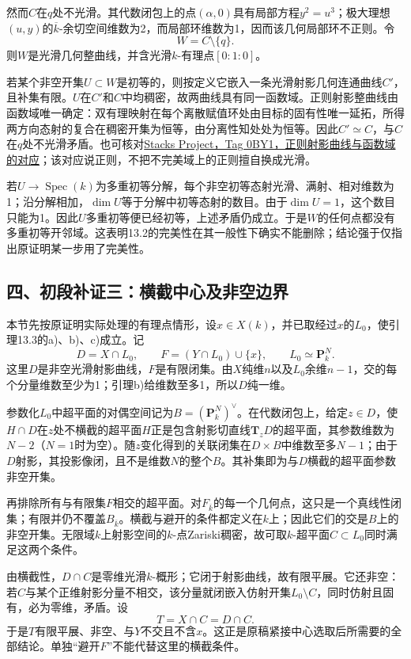 \documentclass[UTF8,a4paper]{ctexbook}
\DeclareMathOperator{\Spec}{Spec}
\begin{document}
然而$C$在$q$处不光滑。其代数闭包上的点$(\alpha,0)$具有局部方程$y^2=u^3$；极大理想$(u,y)$的$\overline k$-余切空间维数为2，而局部环维数为1，因而该几何局部环不正则。令
\[
W=C\setminus\{q\}.
\]
则$W$是光滑几何整曲线，并含光滑$k$-有理点$[0:1:0]$。

若某个非空开集$U\subset W$是初等的，则按定义它嵌入一条光滑射影几何连通曲线$C'$，且补集有限。$U$在$C'$和$C$中均稠密，故两曲线具有同一函数域。正则射影整曲线由函数域唯一确定：双有理映射在每个离散赋值环处由目标的固有性唯一延拓，所得两方向态射的复合在稠密开集为恒等，由分离性知处处为恒等。因此$C'\simeq C$，与$C$在$q$处不光滑矛盾。也可核对\href{https://stacks.math.columbia.edu/tag/0BY1}{Stacks Project，Tag 0BY1，正则射影曲线与函数域的对应}；该对应说正则，不把不完美域上的正则擅自换成光滑。

若$U\to\Spec(k)$为多重初等分解，每个非空初等态射光滑、满射、相对维数为1；沿分解相加，$\dim U$等于分解中初等态射的数目。由于$\dim U=1$，这个数目只能为1。因此$U$多重初等便已经初等，上述矛盾仍成立。于是$W$的任何点都没有多重初等开邻域。这表明13.2的完美性在其一般性下确实不能删除；结论强于仅指出原证明某一步用了完美性。

\subsection*{四、初段补证三：横截中心及非空边界}

本节先按原证明实际处理的有理点情形，设$x\in X(k)$，并已取经过$x$的$L_0$，使引理13.3的a)、b)、c)成立。记
\[
D=X\cap L_0,\qquad F=(Y\cap L_0)\cup\{x\},\qquad L_0\simeq\mathbf P^N_k.
\]
这里$D$是非空光滑射影曲线，$F$是有限闭集。由$X$纯维$n$以及$L_0$余维$n-1$，交的每个分量维数至少为1；引理b)给维数至多1，所以$D$纯一维。

参数化$L_0$中超平面的对偶空间记为$B=(\mathbf P^N_k)^\vee$。在代数闭包上，给定$z\in D$，使$H\cap D$在$z$处不横截的超平面$H$正是包含射影切直线$\mathbf T_zD$的超平面，其参数维数为$N-2$（$N=1$时为空）。随$z$变化得到的关联闭集在$D\times B$中维数至多$N-1$；由于$D$射影，其投影像闭，且不是维数$N$的整个$B$。其补集即为与$D$横截的超平面参数非空开集。

再排除所有与有限集$F$相交的超平面。对$F_{\overline k}$的每一个几何点，这只是一个真线性闭集；有限并仍不覆盖$B_{\overline k}$。横截与避开的条件都定义在$k$上；因此它们的交是$B$上的非空开集。无限域$k$上射影空间的$k$-点Zariski稠密，故可取$k$-超平面$C\subset L_0$同时满足这两个条件。

由横截性，$D\cap C$是零维光滑$k$-概形；它闭于射影曲线，故有限平展。它还非空：若$C$与某个正维射影分量不相交，该分量就闭嵌入仿射开集$L_0\setminus C$，同时仿射且固有，必为零维，矛盾。设
\[
T=X\cap C=D\cap C.
\]
于是$T$有限平展、非空、与$Y$不交且不含$x$。这正是原稿紧接中心选取后所需要的全部结论。单独“避开$F$”不能代替这里的横截条件。
\end{document}
